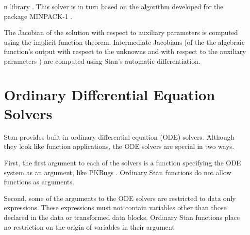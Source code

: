 \begin{description}
\begin{description}
\begin{description}
\begin{description}
\begin{description}
\begin{description}
\begin{description}
\begin{description}
\begin{description}
\begin{description}
\begin{description}
\begin{description}
\begin{description}
\begin{description}
\begin{description}
\begin{description}
\begin{description}
\begin{description}
\begin{description}
\begin{description}
\begin{description}
\begin{description}
\begin{description}
\begin{description}
\begin{description}
\begin{description}
\begin{description}
\begin{description}
\begin{description}
\begin{description}
\begin{description}
\begin{description}
\begin{description}
\begin{description}
\begin{description}
\begin{description}
\begin{description}
\begin{description}
\begin{description}
\begin{description}
\begin{description}
\begin{description}
\begin{description}
\begin{description}
\begin{description}
\begin{description}
\begin{description}
\begin{description}
\begin{description}
\begin{description}
\begin{description}
\begin{description}
\begin{description}
\begin{description}
\begin{description}
\begin{description}
\begin{description}
\begin{description}
\begin{description}
\begin{description}
\begin{description}
\begin{description}
\begin{description}
\begin{description}
\begin{description}
\begin{description}
\begin{description}
\begin{description}
\begin{description}
\begin{description}
\begin{description}
\begin{description}
\begin{description}
\begin{description}
\begin{description}
\begin{description}
\begin{description}
\begin{description}
\begin{description}
\begin{description}
\begin{description}
\begin{description}
n library \citep{Eigen:2013}. This solver is in turn based on the algorithm developed for the package MINPACK-1 \citep{minpack:1980}.

The Jacobian of the solution with respect to auxiliary parameters is computed using the implicit function theorem. Intermediate Jacobians (of the the algebraic function's output with respect to the unknowns  and with respect to the auxiliary parameters ) are computed using Stan's automatic differentiation.

\section{Ordinary Differential Equation Solvers}

Stan provides built-in ordinary differential equation (ODE) solvers. Although they look like function applications, the ODE solvers are special in two ways.

First, the first argument to each of the solvers is a function specifying the ODE system as an argument, like PKBugs \citep{LunnEtAl:1999}. Ordinary Stan functions do not allow functions as arguments.

Second, some of the arguments to the ODE solvers are restricted to data only expressions. These expressions must not contain variables other than those declared in the data or transformed data blocks. Ordinary Stan functions place no restriction on the origin of variables in their argument 
\end{description}
\end{description}
\end{description}
\end{description}
\end{description}
\end{description}
\end{description}
\end{description}
\end{description}
\end{description}
\end{description}
\end{description}
\end{description}
\end{description}
\end{description}
\end{description}
\end{description}
\end{description}
\end{description}
\end{description}
\end{description}
\end{description}
\end{description}
\end{description}
\end{description}
\end{description}
\end{description}
\end{description}
\end{description}
\end{description}
\end{description}
\end{description}
\end{description}
\end{description}
\end{description}
\end{description}
\end{description}
\end{description}
\end{description}
\end{description}
\end{description}
\end{description}
\end{description}
\end{description}
\end{description}
\end{description}
\end{description}
\end{description}
\end{description}
\end{description}
\end{description}
\end{description}
\end{description}
\end{description}
\end{description}
\end{description}
\end{description}
\end{description}
\end{description}
\end{description}
\end{description}
\end{description}
\end{description}
\end{description}
\end{description}
\end{description}
\end{description}
\end{description}
\end{description}
\end{description}
\end{description}
\end{description}
\end{description}
\end{description}
\end{description}
\end{description}
\end{description}
\end{description}
\end{description}
\end{description}
\end{description}
\end{description}
